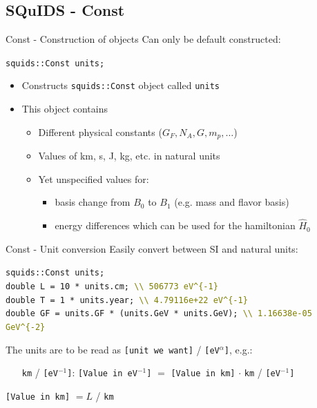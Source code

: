 \documentclass[]{beamer}
\begin{document}
\subsection{SQuIDS - Const}
\begin{frame}{Const - Construction of objects}
  Can only be default constructed:
  \begin{tcolorbox}[colback=gray!5!white]
    \texttt{squids::Const units;} 
  \end{tcolorbox}
  \begin{itemize}
    \item Constructs \texttt{squids::Const} object called \texttt{units}
    \item This object contains
    \begin{itemize}
      \item Different physical constants (\(G_F, N_A, G, m_{p}, \ldots\))
      \item Values of km, s, J, kg, etc. in natural units
      \item Yet unspecified values for: 
      \begin{itemize}
        \item basis change from \(B_0\) to \(B_1\) (e.g. mass and flavor basis)
        \item energy differences which can be used for the hamiltonian \(\hat{H}_0\)
      \end{itemize}
    \end{itemize}
  \end{itemize}
\end{frame}

\begin{frame}{Const -  Unit conversion}
  Easily convert between SI and natural units:
  \begin{tcolorbox}[colback=gray!5!white]
    \texttt{squids::Const units;} \\
    \texttt{double L = 10 * units.cm; \textcolor{olive}{\textbackslash \textbackslash {} 506773 eV\^{}\{-1\}}} \\ 
    \texttt{double T = 1 * units.year; \textcolor{olive}{\textbackslash \textbackslash {} 4.79116e+22 eV\^{}\{-1\}}} \\
    \texttt{double GF = units.GF * (units.GeV * units.GeV); \textcolor{olive}{\textbackslash \textbackslash {} 1.16638e-05 GeV\^{}\{-2\}}}
  \end{tcolorbox}
  The units are to be read as \texttt{[unit we want]} / \texttt{[eV}\(^{\alpha}\)\texttt{]}, e.g.:
  \begin{itemize}
    \item[\texttt{km} / \texttt{[eV}\(^{-1}\)\texttt{]}:] \texttt{[Value in eV}\(^{-1}\)\texttt{]} \(=\) \texttt{[Value in km]} \(\cdot\) \texttt{km} / \texttt{[eV}\(^{-1}\)\texttt{]}
  \end{itemize}
  \texttt{[Value in km]} \(= L \) / \texttt{km}
\end{frame}
\end{document}
